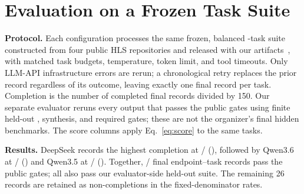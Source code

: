 \section{Evaluation on a Frozen Task Suite}
\label{sec:evaluation}

\textbf{Protocol.} Each configuration processes the same frozen, balanced
\CorpusTaskCount{}-task suite constructed from four public HLS repositories
and released with our artifacts~\cite{fpt26repo}, with matched task budgets,
temperature, token limit, and tool timeouts. Only LLM-API infrastructure errors
are rerun; a chronological retry replaces the prior record regardless of its
outcome, leaving exactly one final record per task. Completion is the number of
completed final records divided by 150. Our separate evaluator reruns every
output that passes the public gates using finite held-out \CSim, synthesis, and
required \CoSim{} gates; these are not the organizer's final hidden benchmarks.
The score columns apply Eq.~\eqref{eq:score} to the same
\CommonQorTaskCount{} tasks.

\begin{table}[!h]
  \centering
  \caption{\textbf{Final campaign results.} Completion uses the fixed
  150-task denominator; Held-out is conditional on Completion. Scores use the
  paired subset.}
  \label{tab:headline-results}
  \scriptsize
\end{table}

\textbf{Results.} DeepSeek records the highest completion at
\DeepSeekSuccessCount{}/\CorpusTaskCount{} (\DeepSeekSuccessRate), followed by
Qwen3.6 at \QwenThreeSixSuccessCount{}/\CorpusTaskCount{}
(\QwenThreeSixSuccessRate) and Qwen3.5 at
\QwenThreeFiveSuccessCount{}/\CorpusTaskCount{} (\QwenThreeFiveSuccessRate).
Together, \IndependentEvaluatedCount{}/\TotalModelTaskRuns{} final
endpoint--task records pass the public gates; all
\IndependentHiddenCorrectCount{} also pass our evaluator-side held-out suite.
The remaining 26 records are retained as non-completions in the
fixed-denominator rates.

